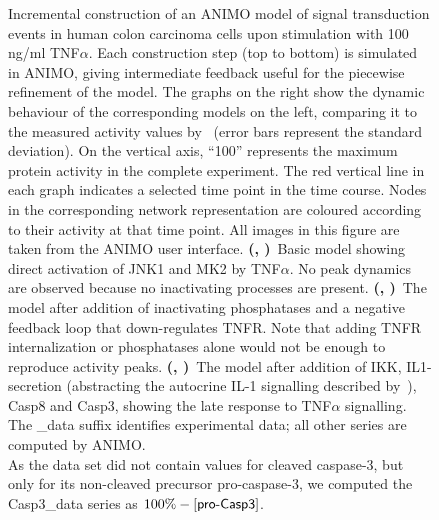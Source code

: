 \documentclass{bmcart}
\begin{document}
\begin{backmatter}
\begin{figure}[!bhtp]
\begin{tabular}{ll}
\end{tabular}
  \caption{
Incremental construction of an ANIMO model of signal transduction
events in human colon carcinoma cells upon stimulation with 100 ng/ml TNF$\alpha$.
Each construction step (top to bottom) is simulated in ANIMO, giving intermediate feedback
useful for the piecewise refinement of the model.
The graphs on the right show the dynamic behaviour of the corresponding models on the left, comparing it to the measured
activity values by~\cite{pathway-compendium} (error bars represent the standard deviation).
On the vertical axis, ``100'' represents the maximum protein activity in the complete experiment.
The red vertical line in each graph indicates a selected time point in the time course. 
Nodes in the corresponding network representation are coloured according to their activity at that time point.
All images in this figure are taken from the ANIMO user interface.
{\bf (\protect{}, \protect{})}~Basic model showing direct activation of JNK1 and MK2 by TNF$\alpha$.
No peak dynamics are observed because no inactivating processes are present.
{\bf (\protect{}, \protect{})}~The model after addition of inactivating phosphatases and a
negative feedback loop that down-regulates TNFR. Note that adding TNFR internalization or phosphatases alone would not be enough to reproduce activity peaks.
{\bf (\protect{}, \protect{})}~The model after addition of IKK, IL1-secretion (abstracting
the autocrine IL-1 signalling described by~\cite{pathway-autocrine}), Casp8 and Casp3, showing the late response to TNF$\alpha$ signalling.\\
The {\sf \_{}data} suffix identifies experimental data; all other series are computed by ANIMO.\\
As the data set did not contain values for cleaved caspase-3, but only for its non-cleaved precursor pro-caspase-3,
we computed the {\sf Casp3\_{}data} series as $100\% - [\mbox{\sf pro-Casp3}]$.}\label{fig:small-model}
\end{figure}



\end{backmatter}
\end{document}
